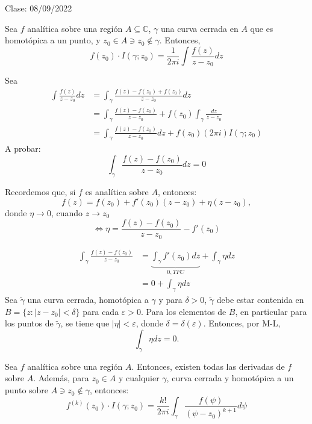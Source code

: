 Clase: 08/09/2022

\begin{problema}[FIC]
    Sea $f$ analítica sobre una región $A\subseteq \mathbb{C}$, $\gamma$ una curva cerrada en $A$ que es homotópica a un punto, y $z_0\in A\ni z_0\not\in \gamma$. Entonces, 
    $$f(z_0)\cdot I(\gamma;z_0)= \frac{1}{2\pi i}\int\frac{f(z)}{z-z_0}dz$$
    \begin{dem}
        Sea
        \begin{align*}
            \int \frac{f(z)}{z-z_0}dz &= \int_\gamma \frac{f(z)-f(z_0)+f(z_0)}{z-z_0}dz\\
            &= \int_\gamma \frac{f(z)-f(z_0)}{z-z_0}+f(z_0)\int_\gamma \frac{dz}{z-z_0}\\
            &= \int_\gamma \frac{f(z)-f(z_0)}{z-z_0}dz +f(z_0)(2\pi i)I(\gamma; z_0)
        \end{align*}
        A probar: $$\int_\gamma \frac{f(z)-f(z_0)}{z-z_0}dz=0$$
        \begin{cajita}
            Recordemos que, si $f$ es analítica sobre $A$, entonces: 
            $$f(z)=f(z_0)+f'(z_0)(z-z_0)+\eta(z-z_0),$$
            donde $\eta \to 0$, cuando $z\to z_0$
            $$\iff \eta =\frac{f(z)-f(z_0)}{z-z_0}-f'(z_0)$$
        \end{cajita}
        \begin{align*}
            \int_\gamma \frac{f(z)-f(z_0)}{z-z_0} &= \underbrace{\int_\gamma f'(z_0)dz}_{0, TFC}+\int_\gamma \eta dz\\
            &= 0 +\int_\gamma \eta dz
        \end{align*}
        Sea $\tilde{\gamma}$ una curva cerrada, homotópica a $\gamma$ y para $\delta>0$, $\tilde{\gamma}$ debe estar contenida en $B=\{z: |z-z_0|<\delta \}$ para cada $\varepsilon >0$. Para los elementos de $B$, en particular para los puntos de $\tilde{\gamma}$, se tiene que $|\eta| < \varepsilon$, donde $\delta=\delta(\varepsilon)$. Entonces, por M-L, 
        $$\int_\gamma \eta dz = 0.$$
    \end{dem}
\end{problema}

\begin{teorema}
    Sea $f$ analítica sobre una región $A$. Entonces, existen todas las derivadas de $f$ sobre $A$. Además, para $z_0\in A$ y cualquier $\gamma$, curva cerrada y homotópica a un punto sobre $A\ni z_0\not\in \gamma$, entonces: 
    $$f^{(k)}(z_0)\cdot I(\gamma;z_0)=\frac{k!}{2\pi i}\int_\gamma \frac{f(\psi)}{(\psi -z_0)^{k+1}}d\psi $$
\end{teorema}

